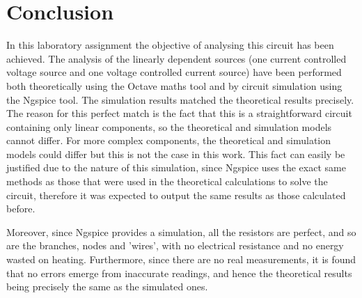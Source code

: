 \section{Conclusion}
\label{sec:conclusion}

In this laboratory assignment the objective of analysing this circuit has been
achieved. The analysis of the linearly dependent sources (one current controlled voltage source and one voltage controlled current source) have been performed both theoretically using the Octave maths tool and by circuit simulation using the
Ngspice tool. The simulation results matched the theoretical results
precisely. The reason for this perfect match is the fact that this is a
straightforward circuit containing only linear components, so the theoretical
and simulation models cannot differ. For more complex components, the
theoretical and simulation models could differ but this is not the case in this
work. This fact can easily be justified due to the nature of this simulation, since Ngspice uses the exact same methods as those that were used in the theoretical calculations to solve the circuit, therefore it was expected to output the same results as those calculated before. 
 \par Moreover, since Ngspice provides a simulation, all the resistors are perfect, and so are the branches, nodes and 'wires', with no electrical resistance  and no energy wasted on heating. Furthermore, since there are no real measurements, it is found that no errors emerge from inaccurate readings, and hence the theoretical results being precisely the same as the simulated ones.